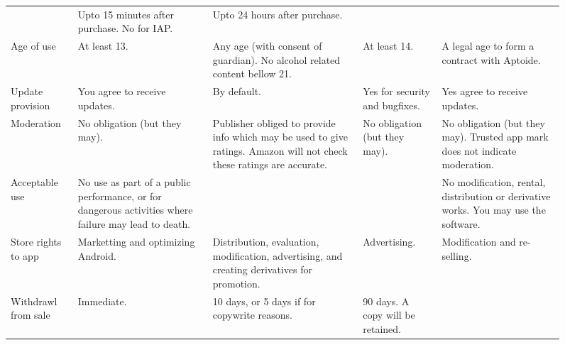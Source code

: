 \documentclass[a4paper]{scrartcl}
\begin{document}
\begin{figure}[!h]
\begin{tabulary}{\linewidth}{lLLLL}
                     & Upto 15 minutes after purchase. No for IAP.
                     & Upto 24 hours after purchase.                                                                                                                                     \\ \addlinespace
Age of use           & At least 13.
                     & Any age (with consent of guardian).  No alcohol related content bellow 21.
                     & At least 14.
                     & A legal age to form a contract with Aptoide.                                                                                                                      \\ \addlinespace
Update provision     & You agree to receive updates.
                     & By default.
                     & Yes for security and bugfixes.
                     & Yes agree to receive updates.                                                                                                                                     \\ \addlinespace
Moderation           & No obligation (but they may).
                     & Publisher obliged to provide info which may be used to give ratings.  Amazon will not check these ratings are accurate.
                     & No obligation (but they may).
                     & No obligation (but they may).  Trusted app mark does not indicate moderation.                                                                                     \\ \addlinespace
Acceptable use       & No use as part of a public performance, or for dangerous activities where failure may lead to death.
                     &
                     &
                     & No modification, rental, distribution or derivative works.  You may use the software.                                                                             \\ \addlinespace
Store rights to app  & Marketting and optimizing Android.
                     & Distribution, evaluation, modification, advertising, and creating derivatives for promotion.
                     & Advertising.
                     & Modification and re-selling.                                                                                                                                      \\ \addlinespace
Withdrawl from sale  & Immediate.
                     & 10 days, or 5 days if for copywrite reasons.
                     & 90 days. A copy will be retained.

\end{tabulary}
\end{figure}
\end{document}
